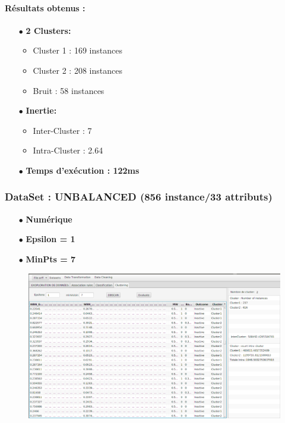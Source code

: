 \documentclass[12pt,a4paper,oneside]{book}
\begin{document}
\paragraph{Résultats obtenus :}
\begin{itemize}
	\item[$\bullet$] \textbf{2 Clusters: }
	\begin{itemize}
		\item Cluster 1 : 169 instances
		\item Cluster 2 : 208 instances
		\item Bruit : 58 instances
	\end{itemize}
	\item[$\bullet$] \textbf{Inertie:}
	\begin{itemize}
		\item Inter-Cluster : 7
		\item Intra-Cluster : 2.64
	\end{itemize}
	\item[$\bullet$] \textbf{Temps d'exécution : 122ms}
\end{itemize}


\subsubsection*{DataSet : UNBALANCED (856 instance/33 attributs)}
\begin{itemize}
	\item[$\bullet$] \textbf{Numérique}
	\item[$\bullet$] \textbf{Epsilon = 1}
	\item[$\bullet$] \textbf{MinPts = 7}
\end{itemize}

\begin{figure}[H]
	\centering
	\includegraphics[scale=0.38]{images/dbscan5-2.png}
	\label{labelname}%
\end{figure}
\end{document}
